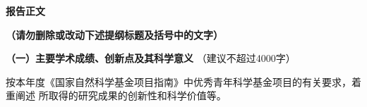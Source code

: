 \begin{center}
 \kaishu{} \bfseries{} \sanhao{} 报告正文
\end{center}

{\kaishu{}\bfseries{}\sihao{}
  \textcolor{NsfcBlue}
  {（请勿删除或改动下述提纲标题及括号中的文字）}
}

{\kaishu{}\sihao{}
  \textcolor{NsfcBlue}
  {\bfseries{}（一）主要学术成绩、创新点及其科学意义}
  \color{NsfcBlue}（建议不超过4000字）
}

{\kaishu{}\sihao{}
  \textcolor{NsfcBlue}{
  按本年度《国家自然科学基金项目指南》中优秀青年科学基金项目的有关要求，着重阐述
  所取得的研究成果的创新性和科学价值等。
}}%
